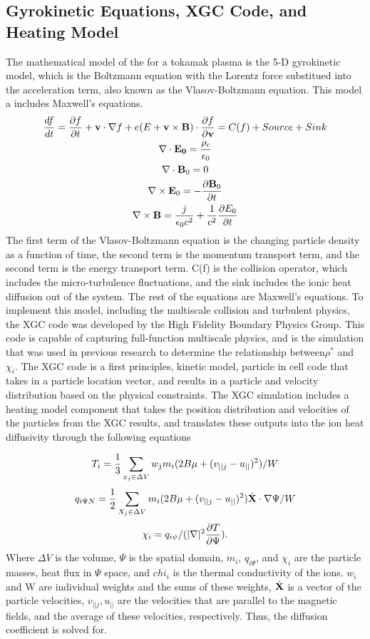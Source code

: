 \documentclass{article}
\begin{document}
\subsection{Gyrokinetic Equations, XGC Code, and Heating Model}
The mathematical model of the for a tokamak plasma is the 5-D gyrokinetic model, which is the Boltzmann equation with the Lorentz force substitued into the acceleration term, also known as the Vlasov-Boltzmann equation. This model a includes Maxwell's equations.
\begin{gather*}
\frac{df}{dt} = \frac{\partial f}{\partial t} + \bold{v}\cdot\nabla f + e(E + \bold{v}\times\bold{B})\cdot\frac{\partial f}{\partial \bold{v}} =C(f) + Source + Sink\\
\nabla \cdot \bold{E_0} = \frac{\rho_c}{\epsilon_0}\\
\nabla\cdot \bold{B}_0=0\\
\nabla \times \bold{E}_0 = - \frac{\partial \bold{B}_0}{\partial t}\\
\nabla\times \bold{B} = \frac{j}{\epsilon_0 c^2} + \frac{1}{c^2}\frac{\partial E_0}{\partial t}
\end{gather*}
The first term of the Vlasov-Boltzmann equation is the changing particle density as a function of time, the second term is the momentum transport term, and the second term is the energy transport term. C(f) is the collision operator, which includes the micro-turbulence fluctuations, and the sink includes the ionic heat diffusion out of the system. The rest of the equations are Maxwell's equations. 
To implement this model, including the multiscale collision and turbulent physics, the XGC code was developed by the High Fidelity Boundary Physics Group. This code is capable of capturing full-function multiscale physics, and is the simulation that was used in previous research to determine the relationship between$\rho^*$ and $\chi_i$. The XGC code is a first principles, kinetic model, particle in cell code that takes in a particle location vector, and results in a particle and velocity distribution based on the physical constraints. The XGC simulation includes a heating model component that takes the position distribution and velocities of the particles from the XGC results, and translates these outputs into the ion heat diffusivity through the following equations

$$
T_i = \frac{1}{3}\sum_{x_j \in \Delta V}w_jm_i(2B\mu+(v_{||j} - u_{||})^2)/W\\
$$
$$
q_{i\Psi N} = \frac{1}{2}\sum_{X_j \in \Delta V}m_i(2B\mu+(v_{||j} - u_{||})^2)\dot{\bold{X}}\cdot \nabla \Psi /W\\
$$
$$
\chi_i = q_{i \psi}/(|\nabla|^2\frac{\partial T}{\partial \Psi}).\\
$$
Where $\Delta V$ is the volume,  $\Psi$ is the spatial domain, $m_i$, $q_{i\Psi}$, and $\chi_i$ are the particle masses, heat flux in $\Psi$ space, and $chi_i$ is the thermal conductivity of the ions. $w_i$ and W are individual weights and the sums of these weights,  $\dot{\bold{X}}$ is a vector of the particle velocities, $v_{||j},  u_{||}$ are the velocities that are parallel to the magnetic fields, and the average of these velocities, respectively. Thus, the diffusion coefficient is solved for.\\
\end{document}
